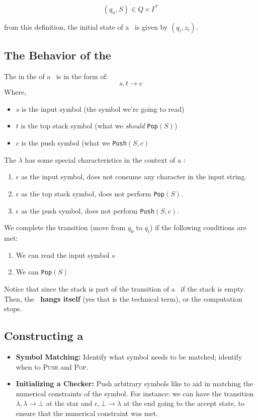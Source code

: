 \[
    (q_n,S)\in Q\times\Gamma^*
\]

from this definition, the initial state of a \pda\, is given by $(q_i,z_i)$.

\subsection{The Behavior of the \pda}

The  in the   of a \pda\, is in the form of:
\[
    s,t\to c
\]
Where,
\begin{itemize}
    \item $s$ is the input symbol (the symbol we're going to read)
    \item $t$ is the top stack symbol (what we \textit{should} \texttt{Pop}$(S)$)
    \item $c$ is the push symbol (what we \texttt{Push}$(S,c)$
\end{itemize}

The  $\lambda$ has some special characteristics in the context of a \pda:
\begin{enumerate}
    \item $\epsilon$ as the input symbol, does not consume any character in the input string.
    \item $\epsilon$ as the top stack symbol, does not perform \texttt{Pop}$(S)$.
    \item $\epsilon$ as the push symbol, does not perform \texttt{Push}$(S,c)$.
\end{enumerate}

We complete the transition (move from $q_0$ to $q_i$) if the following conditions are met:
\begin{enumerate}
    \item We can read the input symbol $s$
    \item We can \texttt{Pop}$(S)$
\end{enumerate}

Notice that since the stack is part of the transition of a \pda\, if the stack is empty. Then, the \textbf{\pda\, hangs itself} (yes that is the technical term), or the computation stops.

\subsection{Constructing a \pda}

\begin{itemize}
    \item \textbf{Symbol Matching:} Identify what symbol needs to be matched; identify when to \textsc{Push} and \textsc{Pop}.
    \item \textbf{Initializing a Checker:} Push arbitrary symbols like to aid in matching the numerical constraints of the symbol. For instance: we can have the transition $\lambda,\lambda\to \bot$ at the star and $\epsilon,\bot\to\lambda$ at the end going to the accept state, to ensure that the numerical constraint was met.
\end{itemize}

